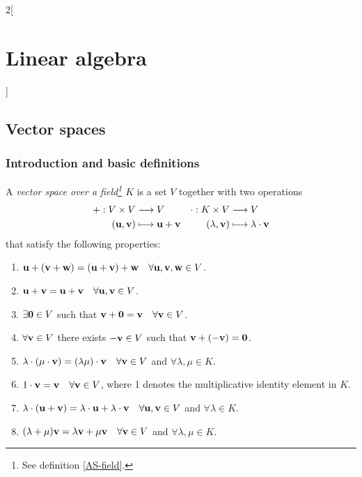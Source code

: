 \documentclass[../../../main.tex]{subfiles}
\begin{document}
\begin{multicols}{2}[\section{Linear algebra}]
  \subsection{Vector spaces}
  \subsubsection*{Introduction and basic definitions}
  \begin{definition}
    A \textit{vector space over a field\footnote{See definition \ref{AS-field}.} $K$} is a set $V$ together with two operations
    \begin{align*}
      +:V\times V                   & \longrightarrow V                        & \cdot:K\times V         & \longrightarrow V                      \\
      (\vb{u},\vb{v}) & \longmapsto \vb{u}+ \vb{v} & (\lambda,\vb{v}) & \longmapsto \lambda\cdot \vb{v}
    \end{align*}
    that satisfy the following properties:
    \begin{enumerate}
      \item $\vb{u}+(\vb{v}+\vb{w})=(\vb{u}+\vb{v})+\vb{w}\quad\forall\vb{u},\vb{v},\vb{w}\in V$.
      \item $\vb{u}+\vb{v}=\vb{u}+\vb{v}\quad\forall\vb{u},\vb{v}\in V$.
      \item $\exists\vb{0}\in V$ such that $\vb{v}+\vb{0}=\vb{v}\quad\forall\vb{v}\in V$.
      \item $\forall\vb{v}\in V$ there exists $-\vb{v}\in V$ such that $\vb{v}+(-\vb{v})=\vb{0}$.
      \item $\lambda\cdot(\mu\cdot\vb{v})=(\lambda\mu)\cdot\vb{v}\quad\forall\vb{v}\in V$ and $\forall\lambda,\mu\in K$.
      \item $1\cdot\vb{v}=\vb{v}\quad\forall\vb{v}\in V$, where 1 denotes the multiplicative identity element in $K$.
      \item $\lambda\cdot(\vb{u}+\vb{v})=\lambda\cdot\vb{u}+\lambda\cdot\vb{v}\quad\forall\vb{u},\vb{v}\in V$ and $\forall\lambda\in K$.
      \item $(\lambda+\mu)\vb{v}=\lambda\vb{v}+\mu\vb{v}\quad\forall\vb{v}\in V$ and $\forall\lambda,\mu\in K$.

\end{enumerate}
\end{definition}
\end{multicols}
\end{document}
